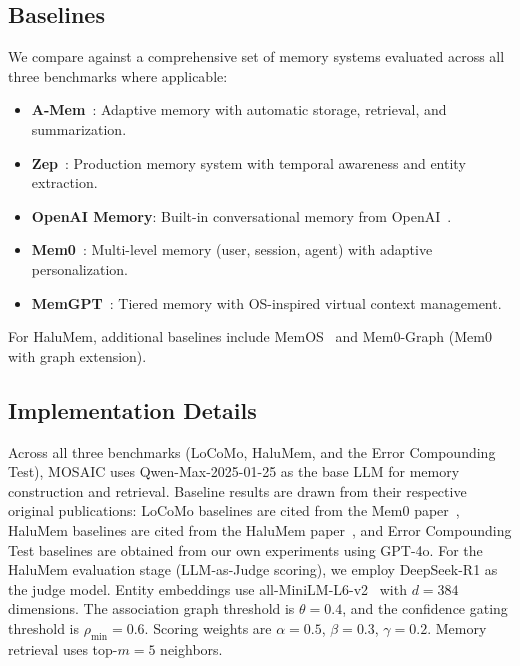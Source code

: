 \documentclass[10pt,twocolumn]{article}
\begin{document}
\subsection{Baselines}
\label{sec:baselines}

We compare against a comprehensive set of memory systems evaluated across
all three benchmarks where applicable:

\begin{itemize}[noitemsep,topsep=3pt]
  \item \textbf{A-Mem}~\citep{xu2025mem}: Adaptive memory with automatic
    storage, retrieval, and summarization.
  \item \textbf{Zep}~\citep{rasmussen2025zep}: Production memory system with
    temporal awareness and entity extraction.
  \item \textbf{OpenAI Memory}: Built-in conversational memory from
    OpenAI~\citep{achiam2023gpt}.
  \item \textbf{Mem0}~\citep{chhikara2025mem0}: Multi-level memory (user, session,
    agent) with adaptive personalization.
  \item \textbf{MemGPT}~\citep{packer2023memgpt}: Tiered memory with
    OS-inspired virtual context management.
\end{itemize}

For HaluMem, additional baselines include MemOS~\citep{li2025memos}
and Mem0-Graph (Mem0 with graph extension).

\subsection{Implementation Details}
\label{sec:implementation}

Across all three benchmarks (LoCoMo, HaluMem, and the Error Compounding
Test), MOSAIC uses Qwen-Max-2025-01-25 as the base LLM for memory
construction and retrieval. Baseline results are drawn from their
respective original publications: LoCoMo baselines are cited from the
Mem0 paper~\citep{chhikara2025mem0}, HaluMem baselines are cited from
the HaluMem paper~\citep{chen2025halumem}, and Error Compounding Test
baselines are obtained from our own experiments using GPT-4o.
For the HaluMem evaluation stage (LLM-as-Judge scoring), we employ
DeepSeek-R1 as the judge model.
Entity embeddings use all-MiniLM-L6-v2~\citep{reimers2019sentence} with
$d = 384$ dimensions. The association graph threshold is $\theta = 0.4$,
and the confidence gating threshold is $\rho_{\min} = 0.6$. Scoring
weights are $\alpha = 0.5$, $\beta = 0.3$, $\gamma = 0.2$. Memory
retrieval uses top-$m = 5$ neighbors.
\end{document}

